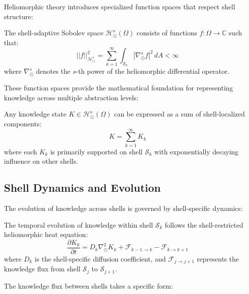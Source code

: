 Heliomorphic theory introduces specialized function spaces that respect shell structure:

\begin{definition}
The shell-adaptive Sobolev space $\mathcal{H}_{\odot}^s(\Omega)$ consists of functions $f: \Omega \rightarrow \mathbb{C}$ such that:
\begin{equation}
||f||_{\mathcal{H}_{\odot}^s}^2 = \sum_{k=1}^{\infty} \int_{\mathcal{S}_k} |\nabla_{\odot}^s f|^2 \, dA < \infty
\end{equation}
where $\nabla_{\odot}^s$ denotes the $s$-th power of the heliomorphic differential operator.
\end{definition}

These function spaces provide the mathematical foundation for representing knowledge across multiple abstraction levels:

\begin{theorem}
Any knowledge state $K \in \mathcal{H}_{\odot}^s(\Omega)$ can be expressed as a sum of shell-localized components:
\begin{equation}
K = \sum_{k=1}^{\infty} K_k
\end{equation}
where each $K_k$ is primarily supported on shell $\mathcal{S}_k$ with exponentially decaying influence on other shells.
\end{theorem}

\subsection{Shell Dynamics and Evolution}

The evolution of knowledge across shells is governed by shell-specific dynamics:

\begin{proposition}
The temporal evolution of knowledge within shell $\mathcal{S}_k$ follows the shell-restricted heliomorphic heat equation:
\begin{equation}
\frac{\partial K_k}{\partial t} = D_k \nabla_{\odot}^2 K_k + \mathcal{F}_{k-1 \to k} - \mathcal{F}_{k \to k+1}
\end{equation}
where $D_k$ is the shell-specific diffusion coefficient, and $\mathcal{F}_{j \to j+1}$ represents the knowledge flux from shell $\mathcal{S}_j$ to $\mathcal{S}_{j+1}$.
\end{proposition}

The knowledge flux between shells takes a specific form:

